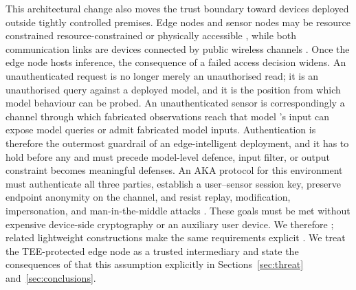 \documentclass[cmc,article,submit,moreauthors,pdftex]{Definitions/tsp}
\providecommand{\DIFadd}[1]{{\protect\color{blue} \sf #1}} %
\providecommand{\DIFdel}[1]{{\protect\color{red} \scriptsize #1}} %
\providecommand{\DIFaddbegin}{} %
\providecommand{\DIFaddend}{} %
\providecommand{\DIFdelbegin}{} %
\providecommand{\DIFdelend}{} %
\begin{document}
This architectural change also moves the trust boundary toward \DIFdelbegin \DIFdel{devices deployed outside tightly controlled premises. Edge nodes and sensor nodes may be resource constrained }\DIFdelend \DIFaddbegin \DIFadd{resource-constrained }\DIFaddend or physically accessible \DIFdelbegin \DIFdel{, while both communication links are }\DIFdelend \DIFaddbegin \DIFadd{devices connected by }\DIFaddend public wireless channels \DIFdelbegin \DIFdel{\cite{jabbari,gupta,wu2017privacy,adil2020}}\DIFdelend \DIFaddbegin \DIFadd{\cite{jabbari,wu2017privacy}}\DIFaddend . Once the edge node hosts inference, \DIFdelbegin \DIFdel{the consequence of }\DIFdelend a failed access decision \DIFdelbegin \DIFdel{widens. An unauthenticated request is no longer merely an unauthorised read; it is an unauthorised query against a deployed model, and it is the position from which model behaviour can be probed. An unauthenticated sensor is correspondingly a channel through which fabricated observations reach that model 's input}\DIFdelend \DIFaddbegin \DIFadd{can expose model queries or admit fabricated model inputs}\DIFaddend . Authentication is therefore the outermost guardrail \DIFdelbegin \DIFdel{of an edge-intelligent deployment, and it has to hold before any }\DIFdelend \DIFaddbegin \DIFadd{and must precede }\DIFaddend model-level \DIFdelbegin \DIFdel{defence, input filter, or output constraint becomes meaningful}\DIFdelend \DIFaddbegin \DIFadd{defenses}\DIFaddend . An AKA protocol for this environment must authenticate all three parties, establish a user--sensor \DIFdelbegin \DIFdel{session }\DIFdelend key, preserve endpoint anonymity on the channel, and resist replay, modification, impersonation, and man-in-the-middle attacks \DIFdelbegin \DIFdel{\cite{adil2021,wang2021revisit,singh,shuai,rangwani}. These goals must be met without expensive device-side cryptography or an auxiliary user device. We therefore }\DIFdelend \DIFaddbegin \DIFadd{\cite{adil2021,wang2021revisit,singh}; related lightweight constructions make the same requirements explicit \cite{shuai,rangwani}. We }\DIFaddend treat the TEE-protected edge node as a trusted intermediary and state \DIFdelbegin \DIFdel{the consequences of that }\DIFdelend \DIFaddbegin \DIFadd{this }\DIFaddend assumption explicitly in Sections~\ref{sec:threat} and~\ref{sec:conclusions}.
\end{document}
